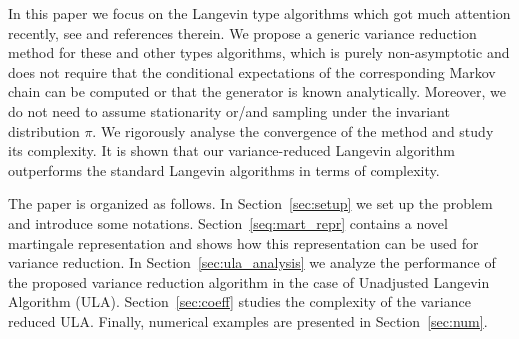 \documentclass[bj]{imsart}
\begin{document}
\par
In this paper we focus on the  Langevin type algorithms which got much attention recently, see \cite{dalalyan2017theoretical,durmus:moulines:2017, MR2353037, MR3861816, MR2977986} and references therein. We propose  a generic variance reduction method for these and other types algorithms, which is purely non-asymptotic and does not require that    the conditional expectations of the corresponding Markov chain can be computed  or that the generator is known analytically. Moreover, we do not need to assume stationarity or/and sampling under the invariant distribution \(\pi.\) We rigorously analyse the convergence of the method and study its complexity. It is shown that  our variance-reduced Langevin algorithm outperforms the standard Langevin algorithms in terms of complexity.
\par
The paper is organized as follows.  In Section~\ref{sec:setup} we set up the problem and introduce some notations. Section~\ref{seq:mart_repr} contains a novel martingale representation and shows how this representation can be used for variance reduction. In Section~\ref{sec:ula_analysis} we analyze the performance of the proposed variance reduction algorithm in the case of Unadjusted Langevin Algorithm (ULA). Section~\ref{sec:coeff} studies the complexity of the variance reduced ULA. Finally, numerical examples are presented in Section~\ref{sec:num}.
\end{document}
